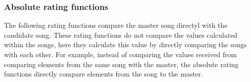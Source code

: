 \subsubsection{Absolute rating functions}
The following rating functions compare the master song directyl with the candidate song. These rating functions do not compare the values calculated within the songs, here they calculate this value by directly comparing the songs with each other. For example, instead of comparing the values received from comparing elements from the same song with the master, the absolute rating functions directly compare elements from the song to the master.


